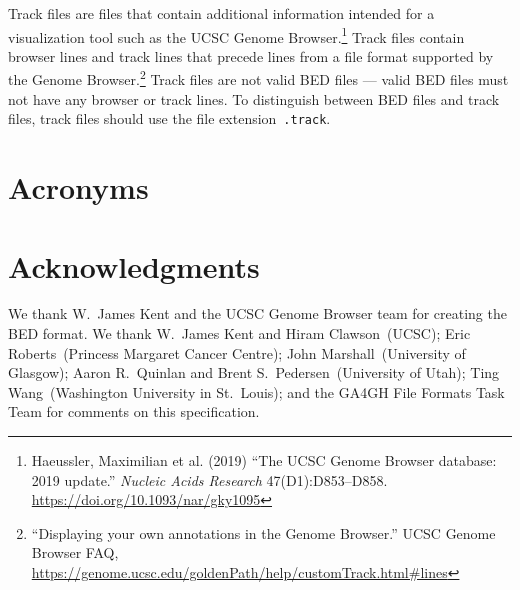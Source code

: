 \documentclass[11pt]{article}
\begin{document}
Track files are files that contain additional information intended for a visualization tool such as the \ac{UCSC} Genome Browser.\footnote{Haeussler, Maximilian et al.
  (2019) ``The \acl{UCSC} Genome Browser database: 2019 update.''
  \emph{Nucleic Acids Research} 47(D1):D853--D858.
  \url{https://doi.org/10.1093/nar/gky1095}}
Track files contain browser lines and track lines that precede lines from a file format supported by the Genome Browser.\footnote{``Displaying your own annotations in the Genome Browser.'' \ac{UCSC} Genome Browser FAQ, \url{https://genome.ucsc.edu/goldenPath/help/customTrack.html\#lines}}
Track files are not valid \ac{BED} files --- valid \ac{BED} files must not have any browser or track lines.
To distinguish between \ac{BED} files and track files, track files should use the file extension~\texttt{.track}.

\section{Acronyms}

\begin{acronym}
\end{acronym}

\section{Acknowledgments}

We thank W.~James Kent and the \ac{UCSC} Genome Browser team for creating the \ac{BED} format.
We thank W.~James Kent and Hiram Clawson~(\ac{UCSC}); Eric Roberts~(Princess Margaret Cancer Centre); John Marshall~(University of Glasgow); Aaron R.~Quinlan and Brent S.~Pedersen~(University of Utah); Ting Wang~(Washington University in St.~Louis); and the \ac{GA4GH} File Formats Task Team for comments on this specification.
\end{document}
